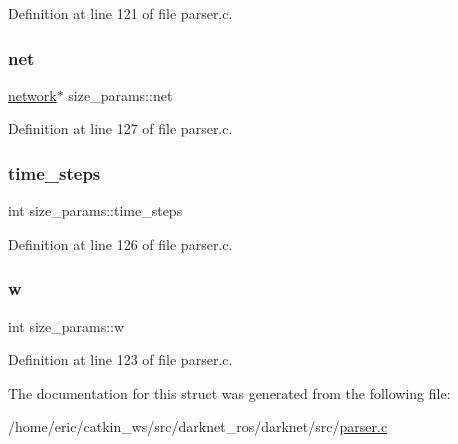Definition at line 121 of file parser.\+c.

\mbox{\label{structsize__params_a44ffe1479502733a5b79cb00a1cb2f87}} 
\subsubsection{\texorpdfstring{net}{net}}
{\footnotesize\ttfamily \mbox{\hyperlink{structnetwork}{network}}$\ast$ size\+\_\+params\+::net}



Definition at line 127 of file parser.\+c.

\mbox{\label{structsize__params_a6d1bb681fb27f447e5428776137a771a}} 
\subsubsection{\texorpdfstring{time\_steps}{time\_steps}}
{\footnotesize\ttfamily int size\+\_\+params\+::time\+\_\+steps}



Definition at line 126 of file parser.\+c.

\mbox{\label{structsize__params_a8497d7dc99707c0993f5a2046c38478f}} 
\subsubsection{\texorpdfstring{w}{w}}
{\footnotesize\ttfamily int size\+\_\+params\+::w}



Definition at line 123 of file parser.\+c.



The documentation for this struct was generated from the following file\+:\begin{DoxyCompactItemize}
\item 
/home/eric/catkin\+\_\+ws/src/darknet\+\_\+ros/darknet/src/\mbox{\hyperlink{parser_8c}{parser.\+c}}\end{DoxyCompactItemize}
